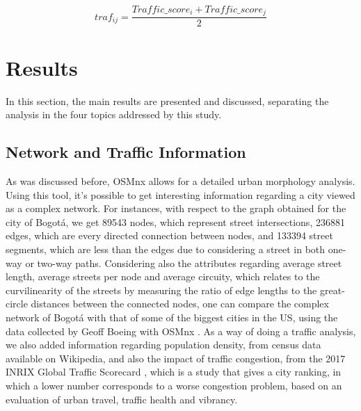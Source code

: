 \documentclass[runningheads]{llncs}
\begin{document}
$$traf_{ij} = \frac{Traffic\_score_{i} + Traffic\_score_{j}}{2}$$


\section{Results}

In this section, the main results are presented and discussed, separating the analysis in the four topics addressed by this study.

\subsection{Network and Traffic Information}

As was discussed before, OSMnx \cite{geoff_osmnx:_2017} allows for a detailed urban morphology analysis. Using this tool, it's possible to get interesting information regarding a city viewed as a complex network. For instances, with respect to the graph obtained for the city of Bogotá, we get 89543 nodes, which represent street intersections, 236881 edges, which are every directed connection between nodes, and 133394 street segments, which are less than the edges due to considering a street in both one-way or two-way paths. Considering also the attributes regarding average street length, average streets per node and average circuity, which relates to the curvilinearity of the streets by measuring the ratio of edge lengths to the great-circle distances between the connected nodes, one can compare the complex network of Bogotá with that of some of the biggest cities in the US, using the data collected by Geoff Boeing with OSMnx \cite{boeing_multi-scale_2018}. As a way of doing a traffic analysis, we also added information regarding population density, from census data available on Wikipedia, and also the impact of traffic congestion, from the 2017 INRIX Global Traffic Scorecard \cite{noauthor_inrix_2017}, which is a study that gives a city ranking, in which a lower number corresponds to a worse congestion problem, based on an evaluation of urban travel, traffic health and vibrancy.
\end{document}
